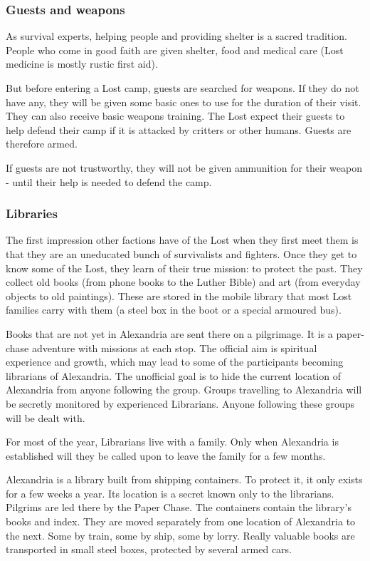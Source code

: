 \subsubsection{Guests and weapons}
\label{sec:Lost guests and weapons}
As survival experts, helping people and providing shelter is a sacred tradition. People who come in good faith are given shelter, food and medical care (Lost medicine is mostly rustic first aid).

But before entering a Lost camp, guests are searched for weapons. If they do not have any, they will be given some basic ones to use for the duration of their visit. They can also receive basic weapons training. The Lost expect their guests to help defend their camp if it is attacked by critters or other humans. Guests are therefore armed.

If guests are not trustworthy, they will not be given ammunition for their weapon - until their help is needed to defend the camp.

\subsubsection{Libraries}

The first impression other factions have of the Lost when they first meet them is that they are an uneducated bunch of survivalists and fighters. Once they get to know some of the Lost, they learn of their true mission: to protect the past. They collect old books (from phone books to the Luther Bible) and art (from everyday objects to old paintings).
These are stored in the mobile library that most Lost families carry with them (a steel box in the boot or a special armoured bus).

Books that are not yet in Alexandria are sent there on a pilgrimage. It is a paper-chase adventure with missions at each stop. The official aim is spiritual experience and growth, which may lead to some of the participants becoming librarians of Alexandria. The unofficial goal is to hide the current location of Alexandria from anyone following the group.
Groups travelling to Alexandria will be secretly monitored by experienced Librarians. Anyone following these groups will be dealt with.

For most of the year, Librarians live with a family. Only when Alexandria is established will they be called upon to leave the family for a few months.

Alexandria is a library built from shipping containers. To protect it, it only exists for a few weeks a year. Its location is a secret known only to the librarians. Pilgrims are led there by the Paper Chase. The containers contain the library's books and index. They are moved separately from one location of Alexandria to the next. Some by train, some by ship, some by lorry. Really valuable books are transported in small steel boxes, protected by several armed cars.


